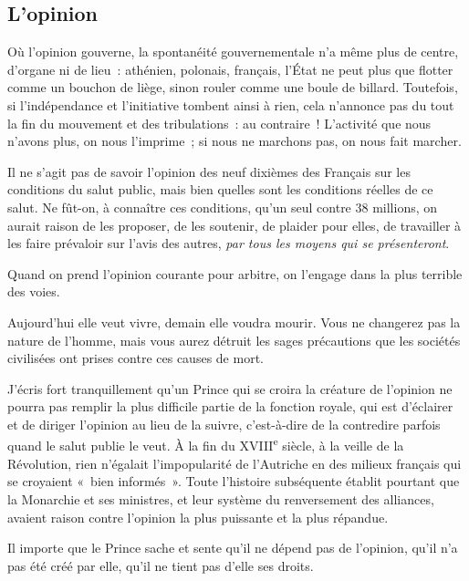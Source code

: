\documentclass[french,twoside]{book} %
\newcommand{\astermono}{\medskip\centerline{\color{rubric}\large\selectfont{\syms ✻}}\medskip\par}%
\begin{document}
\astermono

\subsection[{L’opinion}]{L’opinion}
\noindent Où l’opinion gouverne, la spontanéité gouvernementale n’a même plus de centre, d’organe ni de lieu : athénien, polonais, français, l’État ne peut plus que flotter comme un bouchon de liège, sinon rouler comme une boule de billard. Toutefois, si l’indépendance et l’initiative tombent ainsi à rien, cela n’annonce pas du tout la fin du mouvement et des tribulations : au contraire ! L’activité que nous n’avons plus, on nous l’imprime ; si nous ne marchons pas, on nous fait marcher.\par

\astermono

\noindent Il ne s’agit pas de savoir l’opinion des neuf dixièmes des Français sur les conditions du salut public, mais bien quelles sont les conditions réelles de ce salut. Ne fût-on, à connaître ces conditions, qu’un seul contre 38 millions, on aurait raison de les proposer, de les soutenir, de plaider pour elles, de travailler à les faire prévaloir sur l’avis des autres, \emph{par tous les moyens qui se présenteront}.\par

\astermono

\noindent Quand on prend l’opinion courante pour arbitre, on l’engage dans la plus terrible des voies.\par
Aujourd’hui elle veut vivre, demain elle voudra mourir. Vous ne changerez pas la nature de l’homme, mais vous aurez détruit les sages précautions que les sociétés civilisées ont prises contre ces causes de mort.\par

\astermono

\noindent J’écris fort tranquillement qu’un Prince qui se croira la créature de l’opinion ne pourra pas remplir la plus difficile partie de la fonction royale, qui est d’éclairer et de diriger l’opinion au lieu de la suivre, c’est-à-dire de la contredire parfois quand le salut publie le veut. À la fin du XVIII\textsuperscript{e} siècle, à la veille de la Révolution, rien n’égalait l’impopularité de l’Autriche en des milieux français qui se croyaient « bien informés ». Toute l’histoire subséquente établit pourtant que la Monarchie et ses ministres, et leur système du renversement des alliances, avaient raison contre l’opinion la plus puissante et la plus répandue.\par
Il importe que le Prince sache et sente qu’il ne dépend pas de l’opinion, qu’il n’a pas été créé par elle, qu’il ne tient pas d’elle ses droits.
\end{document}
